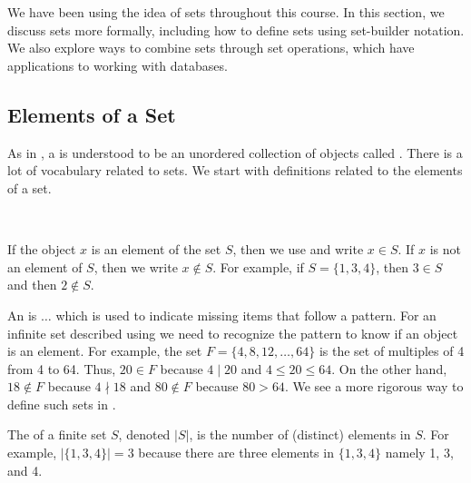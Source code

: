 \section{\secsets}
\label{sec_sets}

We have been using the idea of sets throughout this course.  In this section, we discuss sets more formally, including how to define sets using set-builder notation. We also explore ways to combine sets through set operations, which have applications to working with databases.


\newcommand{\subelements}{Elements of a Set}
\subsection{\subelements}
\label{sub_elements}

As in , a  is understood to be an unordered collection of objects called .  There is a lot of vocabulary related to sets.  We start with definitions related to the elements of a set.

\begin{defn}[Elements]
\label{defn_element}
~
    \begin{apart}
        \item If the object $x$ is an element of the set $S$, then we use  and write $x \in S$.  If $x$ is not an element of $S$, then we write $x \notin S$. For example, if $S=\{1,3,4\}$, then $3 \in S$ and then $2 \notin S$.
        \item An  is $\ldots$ which is used to indicate missing items that follow a pattern.  For an infinite set described using  we  need to recognize the pattern to know if an object is an element.  For example, the set $F = \{4,8,12,\ldots, 64\}$ is the set of multiples of 4 from 4 to 64.  Thus, $20 \in F$ because $4 \mid 20$ and $4 \le 20 \le 64$.  On the other hand, $18 \notin F$ because $4 \nmid 18$ and $80 \notin F$ because $80 >64$.  We see a more rigorous way to define such sets in .
        \item The  of a finite set $S$, denoted $|S|$, is the number of (distinct) elements in $S$.  For example, $|\{1,3,4\}|=3$ because there are three elements in $\{1,3,4\}$ namely 1, 3, and 4.  
    \end{apart}
\end{defn}

